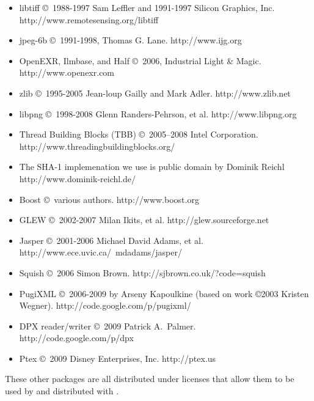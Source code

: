 \begin{itemize}
\item {\cf libtiff} \copyright\ 1988-1997 Sam Leffler and 1991-1997 Silicon
Graphics, Inc. \\ {\cf http://www.remotesensing.org/libtiff}
\item {\cf jpeg-6b} \copyright\ 1991-1998, Thomas G. Lane.  {\cf http://www.ijg.org}
\item OpenEXR, Ilmbase, and Half \copyright\ 2006, Industrial Light \& Magic.\\
{\cf http://www.openexr.com}
\item {\cf zlib} \copyright\ 1995-2005 Jean-loup Gailly and Mark Adler. 
{\cf http://www.zlib.net}
\item {\cf libpng} \copyright\ 1998-2008 Glenn Randers-Pehrson, et al.  
{\cf http://www.libpng.org}
\item Thread Building Blocks (TBB) \copyright\ 2005--2008 Intel Corporation.\\
{\cf http://www.threadingbuildingblocks.org/}
\item The SHA-1 implemenation we use is public domain by
Dominik Reichl \\ {\cf http://www.dominik-reichl.de/}
\item Boost \copyright\ various authors. {\cf http://www.boost.org}
\item GLEW \copyright\ 2002-2007 Milan Ikits, et al. 
{\cf http://glew.sourceforge.net}
\item Jasper \copyright\ 2001-2006 Michael David Adams, et al. \\
{\cf http://www.ece.uvic.ca/~mdadams/jasper/}
\item Squish \copyright\ 2006 Simon Brown.
{\cf http://sjbrown.co.uk/?code=squish}
\item PugiXML \copyright\ 2006-2009 by Arseny Kapoulkine (based on work
\copyright 2003 Kristen Wegner). {\cf http://code.google.com/p/pugixml/}
\item DPX reader/writer \copyright\ 2009 Patrick A.\ Palmer.
{\cf http://code.google.com/p/dpx}
\item Ptex \copyright\ 2009 Disney Enterprises, Inc.
{\cf http://ptex.us}
\end{itemize}

These other packages are all distributed under licenses that allow them
to be used by and distributed with \product.

\chapwidthend
